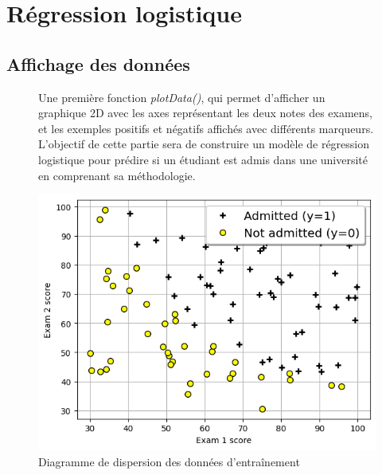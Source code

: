 \section{Régression logistique}
\subsection{Affichage des données}

\begin{figure}[!h]
    \begin{minipage}{.40\linewidth}
            Une première fonction \textit{plotData()}, qui permet d'afficher un graphique 2D avec les axes représentant les deux notes des examens, et les exemples positifs et négatifs affichés avec différents marqueurs. \\
            L'objectif de cette partie sera de construire un modèle de régression logistique pour prédire si un étudiant est admis dans une université en comprenant sa méthodologie.
    \end{minipage}\hfill
    \begin{minipage}{.56\linewidth}
        \begin{center}
            \includegraphics[width=1\textwidth]{./img/3.1.png}
            \caption{\label{fig:fig1}Diagramme de dispersion des données d'entraînement}  
        \end{center}
    \end{minipage}
\end{figure}

